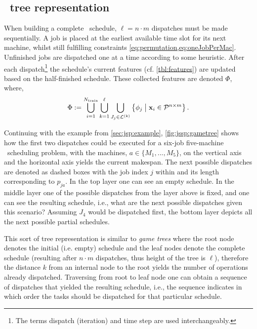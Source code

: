 \subsection{\Jsp\ tree representation}\label{sec:gen:gametree}
When building a complete \jsp\ schedule, $\ell=n\cdot m$ dispatches must be made sequentially.
A job is placed at the earliest available time slot for its next machine, whilst still fulfilling constraints \cref{eq:permutation,eq:oneJobPerMac}.
Unfinished jobs are dispatched one at a time according to some heuristic. 
After each dispatch\footnote{The terms dispatch (iteration) and time step are used interchangeably.} the schedule's current features (cf. \cref{tbl:features}) are updated based on the half-finished schedule. 
These collected features are denoted $\Phi$, where, 
\begin{eqnarray}\label{eq:Phi}
	\Phi:= \bigcup_{i=1}^{N_{\text{train}}} 
	\bigcup_{k=1}^\ell\bigcup_{J_j\in\mathcal{L}^{(k)}} 
    \condset{\vphi_j}{\vec{x}_i\in\mathcal{P}^{n\times m} }.
\end{eqnarray}

Continuing with the example from \cref{sec:jsp:example}, \cref{fig:jssp:gametree} shows how the first two dispatches could be executed for a six-job five-machine \jsp\ scheduling problem, with the machines, $a\in\{M_1,...,M_5\}$, on the vertical axis and the horizontal axis yields the current makespan. The next possible dispatches are denoted as dashed boxes with the job index $j$ within and its length corresponding to $p_{ja}$.
In the top layer one can see an empty schedule.
In the middle layer one of the possible dispatches from the layer above is fixed, and one can see the resulting schedule, i.e., what are the next possible dispatches given this scenario? Assuming $J_4$ would be dispatched first, the bottom layer depicts all the next possible partial schedules.

This sort of tree representation is similar to \emph{game trees} \citep[cf.][]{Rosen03} where the root node denotes the initial (i.e. empty) schedule and the leaf nodes denote the complete schedule (resulting after $n\cdot m$ dispatches, thus height of the tree is $\ell$), therefore the distance $k$ from an internal node to the root yields the number of operations already dispatched. Traversing from root to leaf node one can obtain a sequence of dispatches that yielded the resulting schedule, i.e., the sequence indicates in which order the tasks should be dispatched for that particular schedule. 

